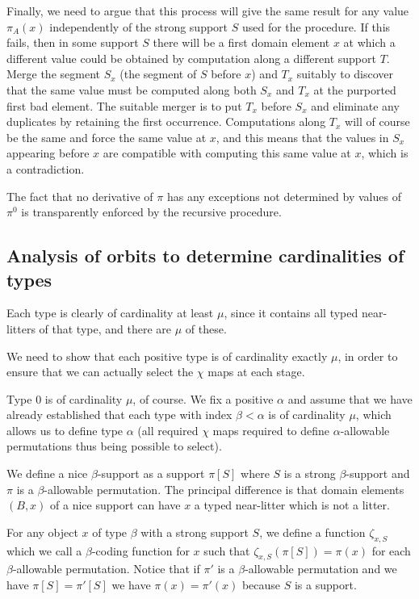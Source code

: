 \documentclass[12pt]{article}
\begin{document}
\begin{description}
Finally, we need to argue that this process will give the same result for any value $\pi_A(x)$ independently of the strong support $S$ used for the procedure.  If this fails, then in some support $S$ there will be a first domain element $x$ at which
a different value could be obtained by computation along a different support $T$.  Merge the segment $S_x$ (the segment of $S$ before $x$) and $T_x$ suitably to discover that the same value must be computed along both $S_x$ and $T_x$ at the purported first bad element.  The suitable
merger is to put $T_x$ before $S_x$ and eliminate any duplicates by retaining the first occurrence.  Computations along $T_x$ will of course be the same and force the same value at $x$, and this means that the values in $S_x$ appearing before $x$ are compatible with computing this same value at $x$, which is a contradiction.

The fact that no derivative of $\pi$ has any exceptions not determined by values of $\pi^0$  is transparently enforced by the recursive procedure.

\end{description}

\subsection{Analysis of orbits to determine cardinalities of types}

Each type is clearly of cardinality at least $\mu$, since it contains all typed near-litters of that type, and there are $\mu$ of these.

We need to show that each positive type is of cardinality exactly $\mu$, in order to ensure that we can actually
select the $\chi$ maps at each stage.

Type 0 is of cardinality $\mu$, of course.  We fix a positive $\alpha$ and assume that we have already established that
each type with index $\beta<\alpha$ is of cardinality $\mu$, which allows us to define type $\alpha$ (all required $\chi$ maps required to define $\alpha$-allowable permutations thus being possible to select).

We define a nice $\beta$-support as a support $\pi[S]$ where $S$ is a strong $\beta$-support and $\pi$ is a $\beta$-allowable permutation.  The principal difference is that domain elements $(B,x)$ of a nice support can have $x$ a typed near-litter which is not a litter.

For any object $x$ of type $\beta$ with a strong support $S$, we define a function $\zeta_{x,S}$ which we call a $\beta$-coding function for $x$ such that $\zeta_{x,S}(\pi[S]) = \pi(x)$ for each $\beta$-allowable permutation.  Notice that if $\pi'$ is a $\beta$-allowable permutation and we have 
$\pi[S]=\pi'[S]$ we have $\pi(x)=\pi'(x)$ because $S$ is a support.
\end{document}
